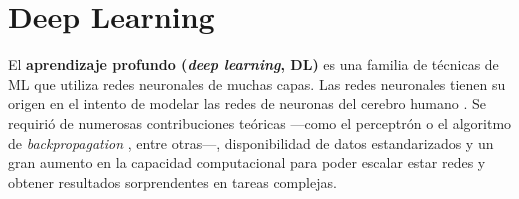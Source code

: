 








\section{Deep Learning}

El \textbf{aprendizaje profundo (\textit{deep learning}, DL)} es una familia de técnicas de ML que utiliza
redes neuronales de muchas capas. 
Las redes neuronales tienen su origen en el intento de modelar las redes de neuronas del cerebro humano 
\cite{mcculloch1943}. Se requirió de numerosas contribuciones teóricas ---como el perceptrón 
\cite{rosenblatt1958} o el algoritmo de \textit{backpropagation} \cite{rumelhart1986,werbos1994}, entre 
otras---, disponibilidad de datos estandarizados y un gran aumento en la capacidad computacional para poder 
escalar estar redes y obtener resultados 
sorprendentes en tareas complejas.

